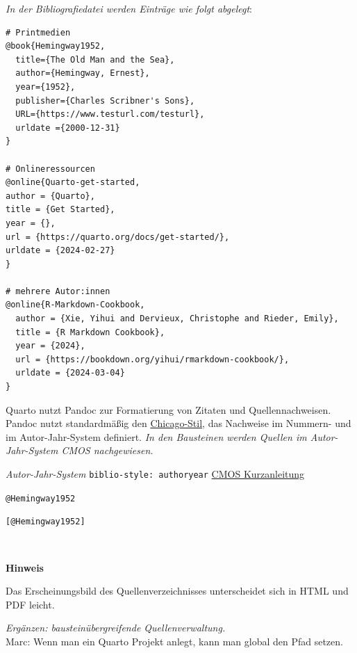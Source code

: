 \documentclass[
  letterpaper,
  DIV=11]{scrartcl}
\providecommand{\tightlist}{%
  \setlength{\itemsep}{0pt}\setlength{\parskip}{0pt}}\usepackage{longtable,booktabs,array}
\begin{document}
\emph{In der Bibliografiedatei werden Einträge wie folgt abgelegt}:

\begin{verbatim}
# Printmedien
@book{Hemingway1952,
  title={The Old Man and the Sea},
  author={Hemingway, Ernest},
  year={1952},
  publisher={Charles Scribner's Sons},
  URL={https://www.testurl.com/testurl},
  urldate ={2000-12-31}
}

# Onlineressourcen
@online{Quarto-get-started,
author = {Quarto},
title = {Get Started},
year = {},
url = {https://quarto.org/docs/get-started/},
urldate = {2024-02-27}
}

# mehrere Autor:innen
@online{R-Markdown-Cookbook,
  author = {Xie, Yihui and Dervieux, Christophe and Rieder, Emily},
  title = {R Markdown Cookbook},
  year = {2024},
  url = {https://bookdown.org/yihui/rmarkdown-cookbook/},
  urldate = {2024-03-04}
}
\end{verbatim}

Quarto nutzt Pandoc zur Formatierung von Zitaten und Quellennachweisen.
Pandoc nutzt standardmäßig den
\href{https://www.chicagomanualofstyle.org/tools_citationguide.html}{Chicago-Stil},
das Nachweise im Nummern- und im Autor-Jahr-System definiert. \emph{In
den Bausteinen werden Quellen im Autor-Jahr-System CMOS nachgewiesen.}

\begin{description}
\tightlist
\item[Zitierstil]
\emph{Autor-Jahr-System} \texttt{biblio-style:\ authoryear}
\href{https://www.scribbr.com/chicago-style/author-date/}{CMOS
Kurzanleitung}

\texttt{@Hemingway1952} \textcite{Hemingway1952}

\texttt{{[}@Hemingway1952{]}} \autocite{Hemingway1952}
\end{description}

~

\begin{tcolorbox}[enhanced jigsaw, breakable, rightrule=.15mm, leftrule=.75mm, opacityback=0, colframe=quarto-callout-warning-color-frame, toprule=.15mm, left=2mm, colback=white, arc=.35mm, bottomrule=.15mm]
\begin{minipage}[t]{5.5mm}
\textcolor{quarto-callout-warning-color}{\faExclamationTriangle}
\end{minipage}%
\begin{minipage}[t]{\textwidth - 5.5mm}

\vspace{-3mm}\textbf{Hinweis}\vspace{3mm}

Das Erscheinungsbild des Quellenverzeichnisses unterscheidet sich in
HTML und PDF leicht.

\emph{Ergänzen: bausteinübergreifende Quellenverwaltung.}\\
Marc: Wenn man ein Quarto Projekt anlegt, kann man global den Pfad
setzen.

\end{minipage}%
\end{tcolorbox}
\end{document}

